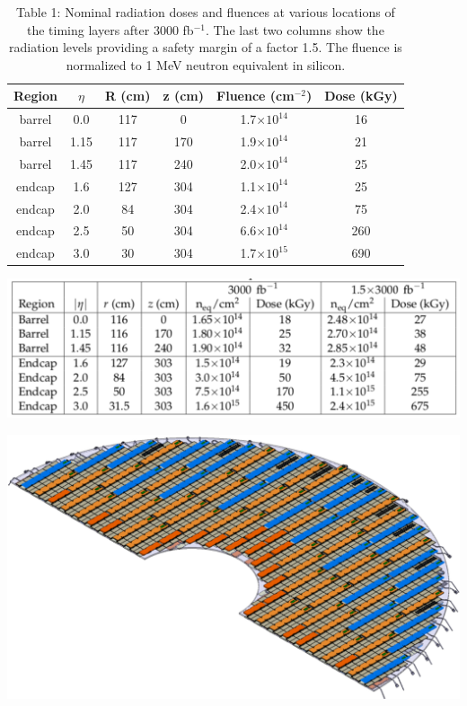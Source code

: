 \documentclass[11pt]{article}
\begin{document}
\begin{table}
  \centering
  \caption{Table 1: Nominal radiation doses and fluences at various locations of the timing layers after 3000 fb$^{-1}$. The last two columns show the radiation levels providing a safety margin of a factor 1.5. The fluence is normalized to 1 MeV neutron equivalent in silicon.}
  \label{table:radiationField}
  \begin{tabular}{ c c c c c c }
    Region & $\eta$ & R (cm) & z (cm) & Fluence (cm$^{-2}$) & Dose (kGy) \\
    \midrule
    barrel & 0.0    & 117    & 0      & 1.7$\times 10^{14}$ & 16         \\
    barrel & 1.15   & 117    & 170    & 1.9$\times 10^{14}$ & 21         \\
    barrel & 1.45   & 117    & 240    & 2.0$\times 10^{14}$ & 25         \\
    endcap & 1.6    & 127    & 304    & 1.1$\times 10^{14}$ & 25         \\
    endcap & 2.0    & 84     & 304    & 2.4$\times 10^{14}$ & 75         \\
    endcap & 2.5    & 50     & 304    & 6.6$\times 10^{14}$ & 260        \\
    endcap & 3.0    & 30     & 304    & 1.7$\times 10^{15}$ & 690        \\
  \end{tabular}
\end{table}

\includegraphics[width=\linewidth]{figures/image4.pdf}

\includegraphics[width=\linewidth]{figures/image3.pdf}
\end{document}
